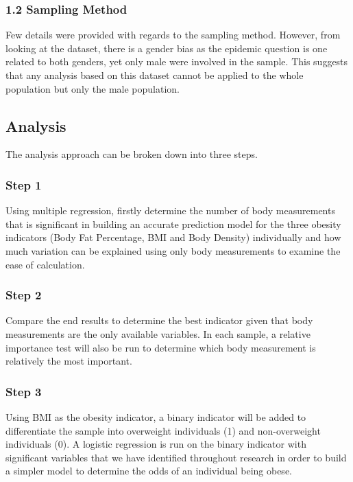 \documentclass[a4paper,9pt,twocolumn,twoside,]{pinp}
\begin{document}
\hypertarget{sampling-method}{%
\subsubsection{1.2 Sampling Method}\label{sampling-method}}

Few details were provided with regards to the sampling method. However,
from looking at the dataset, there is a gender bias as the epidemic
question is one related to both genders, yet only male were involved in
the sample. This suggests that any analysis based on this dataset cannot
be applied to the whole population but only the male population.

\hypertarget{analysis}{%
\subsection{Analysis}\label{analysis}}

The analysis approach can be broken down into three steps.

\hypertarget{step-1}{%
\subsubsection{Step 1}\label{step-1}}

Using multiple regression, firstly determine the number of body
measurements that is significant in building an accurate prediction
model for the three obesity indicators (Body Fat Percentage, BMI and
Body Density) individually and how much variation can be explained using
only body measurements to examine the ease of calculation.

\hypertarget{step-2}{%
\subsubsection{Step 2}\label{step-2}}

Compare the end results to determine the best indicator given that body
measurements are the only available variables. In each sample, a
relative importance test will also be run to determine which body
measurement is relatively the most important.

\hypertarget{step-3}{%
\subsubsection{Step 3}\label{step-3}}

Using BMI as the obesity indicator, a binary indicator will be added to
differentiate the sample into overweight individuals (1) and
non-overweight individuals (0). A logistic regression is run on the
binary indicator with significant variables that we have identified
throughout research in order to build a simpler model to determine the
odds of an individual being obese.
\end{document}
